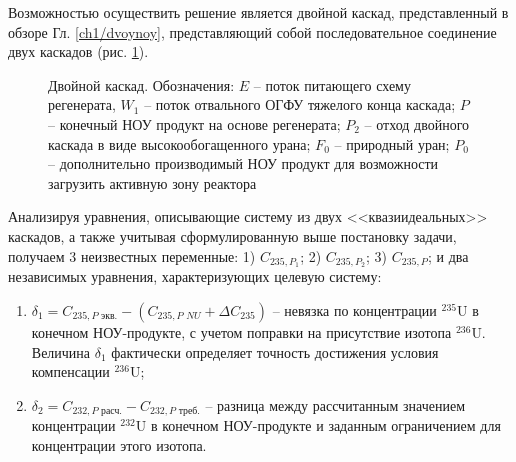 Возможностью осуществить решение является двойной каскад, представленный в обзоре Гл. \ref{ch1/dvoynoy}, представляющий собой последовательное соединение двух каскадов (рис. \ref{fig:double_ru}). 

\begin{figure}[ht]
  \caption{Двойной каскад. Обозначения: $E$ -- поток питающего схему регенерата, $W_1$ -- поток отвального ОГФУ тяжелого конца каскада; $P$ -- конечный НОУ продукт на основе регенерата; $P_2$ -- отход двойного каскада в виде высокообогащенного урана; $F_0$ -- природный уран; $P_0$ -- дополнительно производимый НОУ продукт для возможности загрузить активную зону реактора}\label{fig:double_ru}
\end{figure}

Анализируя уравнения, описывающие систему из двух <<квазиидеальных>> каскадов, а также учитывая сформулированную выше постановку задачи, получаем 3 неизвестных переменные: 1) $C_{235, P_1}$; 2) $C_{235, P_2}$; 3) $C_{235, P}$; и два независимых уравнения, характеризующих целевую систему:

\begin{enumerate}
    \item $\delta_{1}=C_{235,P\textit{ экв.}}-(C_{235,P\textit{ NU}}+\Delta C_{235})$ -- невязка по концентрации $^{235}$U в конечном НОУ-продукте, с учетом поправки на присутствие изотопа $^{236}$U. Величина $\delta_{1}$ фактически определяет точность достижения условия компенсации $^{236}$U;
    \item $\delta_{2}=C_{232,P\textit{ расч.}}-C_{232,P\textit{ треб.}}$ -- разница между рассчитанным значением концентрации $^{232}$U в конечном НОУ-продукте и заданным ограничением для концентрации этого изотопа.
\end{enumerate}

